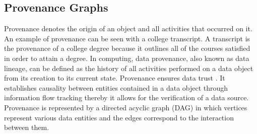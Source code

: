 %
%
%
%
%
%
%




\subsection{Provenance Graphs}

Provenance denotes the origin of an object and all activities that occurred on it. An example of provenance can be seen with a college transcript. A transcript is the provenance of a college degree because it outlines all of the courses satisfied in order to attain a degree. In computing, data provenance, also known as data lineage, can be defined
as the history of all activities performed on a data object from its creation to its current state. Provenance ensures data trust \cite{Bertino2015}. It establishes causality between entities contained in a data object through information flow tracking thereby it allows for the verification of a data source. Provenance is represented by a directed acyclic graph (DAG) in which vertices represent various data entities and the edges correspond to the interaction between them. 


